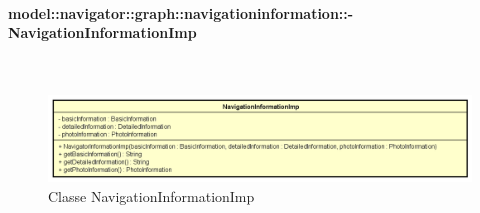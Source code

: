 \documentclass[../DefinizioneDiProdotto.tex]{subfiles}
\begin{document}
\paragraph{model::navigator::graph::navigationinformation::-\\NavigationInformationImp}
\
\begin{figure}[H]
	\centering
	\includegraphics[width=\maxwidth]{img/NavigationInformationImp.png}
	\caption{Classe NavigationInformationImp}\label{fig:model::navigator::graph::navigationinformation::NavigationInformationImp} 
\end{figure}
\end{document}
